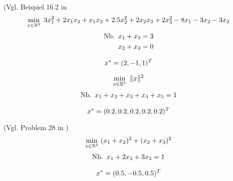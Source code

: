 \begin{testproblem}
(Vgl. Beispiel 16.2 in \cite[S.~452]{nocedal}
\begin{equation}
\min_{x\in\mathbb{R}^3}\ 3 x_1^2 + 2 x_1 x_2 + x_1 x_3 + 2.5 x_2^2 + 2 x_2 x_3 + 2 x_3^2 - 8 x_1 - 3 x_2 - 3 x_3
\end{equation}
\begin{equation*}
\begin{split}
\nb x_1 + x_3 & = 3 \\
x_2 + x_3 & = 0 \\
\end{split}
\end{equation*}

\begin{equation*}
x^* = (2, -1, 1)^T
\end{equation*}
\end{testproblem}

\begin{testproblem}
\begin{equation}
\min_{x\in\mathbb{R}^5}\ \| x \|^2
\end{equation}
\begin{equation*}
\begin{split}
\nb x_1 + x_2 + x_3 + x_4 + x_5 & = 1 \\
\end{split}
\end{equation*}

\begin{equation*}
x^* = (0.2, 0.2, 0.2, 0.2, 0.2)^T
\end{equation*}
\end{testproblem}

\begin{testproblem}
(Vgl. Problem 28 in \cite[S.~51]{hock})
\begin{equation}
\min_{x\in\mathbb{R}^3}\ (x_1 + x_2)^2 + (x_2 + x_3)^2
\end{equation}
\begin{equation*}
\begin{split}
\nb x_1 + 2 x_2 + 3 x_3 & = 1 \\
\end{split}
\end{equation*}

\begin{equation*}
x^* = (0.5, -0.5, 0.5)^T
\end{equation*}
\end{testproblem}


